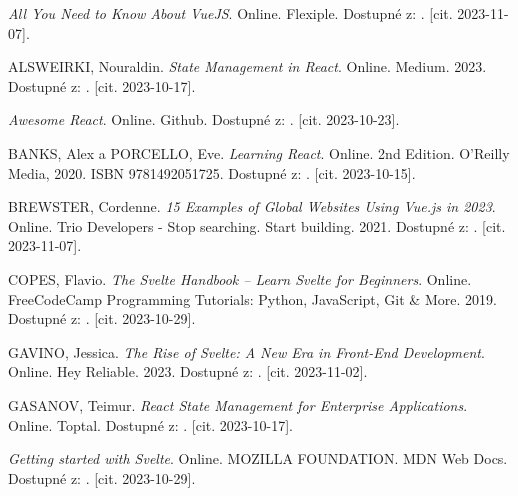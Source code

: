 

\begin{thebibliography}{99}\radkovani[1.2]\raggedright
\label{chap:literatura}

\emph{All You Need to Know About VueJS}. Online. Flexiple. Dostupné z: . [cit. 2023-11-07].

\textsc{ALSWEIRKI}, Nouraldin. \emph{State Management in React}. Online. Medium. 2023. Dostupné z: . [cit. 2023-10-17].

\emph{Awesome React}. Online. Github. Dostupné z: . [cit. 2023-10-23].

\textsc{BANKS}, Alex a \textsc{PORCELLO}, Eve. \emph{Learning React}. Online. 2nd Edition. O'Reilly Media, 2020. ISBN 9781492051725. Dostupné z: . [cit. 2023-10-15].

\textsc{BREWSTER}, Cordenne. \emph{15 Examples of Global Websites Using Vue.js in 2023}. Online. Trio Developers - Stop searching. Start building. 2021. Dostupné z: . [cit. 2023-11-07].

\textsc{COPES}, Flavio. \emph{The Svelte Handbook -- Learn Svelte for Beginners}. Online. FreeCodeCamp Programming Tutorials: Python, JavaScript, Git \& More. 2019. Dostupné z: . [cit. 2023-10-29].

\textsc{GAVINO}, Jessica. \emph{The Rise of Svelte: A New Era in Front-End Development}. Online. Hey Reliable. 2023. Dostupné z: . [cit. 2023-11-02].

\textsc{GASANOV}, Teimur. \emph{React State Management for Enterprise Applications}. Online. Toptal. Dostupné z: . [cit. 2023-10-17].

\emph{Getting started with Svelte}. Online. MOZILLA FOUNDATION. MDN Web Docs. Dostupné z: . [cit. 2023-10-29].


\end{thebibliography}
